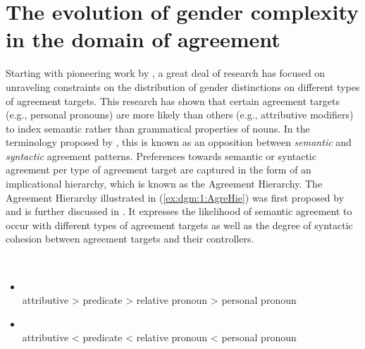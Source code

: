 \documentclass[output=collectionpaper]{langsci/langscibook}
\begin{document}
\section{The evolution of gender complexity in the domain of agreement}
\label{sec:dgm:EvAgr}
Starting with pioneering work by \citet{Corbett1979,Corbett1991}, a great deal of research has focused on unraveling constraints on the distribution of gender distinctions on different types of agreement targets. This research has shown that certain agreement targets (e.g., personal pronouns) are more likely than others (e.g., attributive modifiers) to index semantic rather than grammatical properties of nouns.
In the terminology proposed by \citet{Corbett1979,Corbett1991}, this is known as an opposition between \textit{semantic} and \textit{syntactic} agreement patterns. Preferences towards semantic or syntactic agreement per type of agreement target are captured in the form of an implicational hierarchy, which is known as the Agreement Hierarchy. The Agreement Hierarchy \textendash{} illustrated in (\ref{ex:dgm:1:AgreHie}) \textendash{} was first proposed by \citet{Corbett1979} and is further discussed in \citet{Corbett1991,Corbett2000,Corbett2006}. It expresses the likelihood of semantic agreement to occur with different types of agreement targets as well as the degree of syntactic cohesion between agreement targets and their controllers.

\ea\label{ex:dgm:1:AgreHie}
\\
\begin{itemize}

\item {}\\
attributive {\textgreater}  predicate  {\textgreater} relative pronoun {\textgreater} personal pronoun

\item {}\\
attributive  {\textless} predicate {\textless} relative pronoun {\textless}  personal pronoun

\end{itemize}
\z
\end{document}
